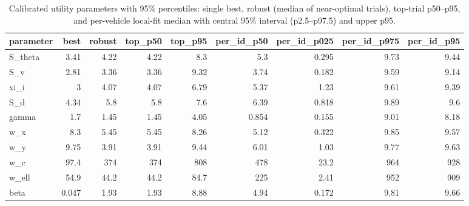 \begin{table}[t]
\centering
\caption{Calibrated utility parameters with 95\% percentiles: single best, robust (median of near-optimal trials), top-trial p50--p95, and per-vehicle local-fit median with central 95\% interval (p2.5--p97.5) and upper p95.}
\label{tab:utility_calibration_params}
\begin{tabular}{lrrrrrrrr}
\toprule
parameter & best & robust & top\_p50 & top\_p95 & per\_id\_p50 & per\_id\_p025 & per\_id\_p975 & per\_id\_p95 \\
\midrule
S\_theta & 3.41 & 4.22 & 4.22 & 8.3 & 5.3 & 0.295 & 9.73 & 9.44 \\
S\_v & 2.81 & 3.36 & 3.36 & 9.32 & 3.74 & 0.182 & 9.59 & 9.14 \\
xi\_i & 3 & 4.07 & 4.07 & 6.79 & 5.37 & 1.23 & 9.61 & 9.39 \\
S\_d & 4.34 & 5.8 & 5.8 & 7.6 & 6.39 & 0.818 & 9.89 & 9.6 \\
gamma & 1.7 & 1.45 & 1.45 & 4.05 & 0.854 & 0.155 & 9.01 & 8.18 \\
w\_x & 8.3 & 5.45 & 5.45 & 8.26 & 5.12 & 0.322 & 9.85 & 9.57 \\
w\_y & 9.75 & 3.91 & 3.91 & 9.44 & 6.01 & 1.03 & 9.77 & 9.63 \\
w\_c & 97.4 & 374 & 374 & 808 & 478 & 23.2 & 964 & 928 \\
w\_ell & 54.9 & 44.2 & 44.2 & 84.7 & 225 & 2.41 & 952 & 909 \\
beta & 0.047 & 1.93 & 1.93 & 8.88 & 4.94 & 0.172 & 9.81 & 9.66 \\
\bottomrule
\end{tabular}
\end{table}
